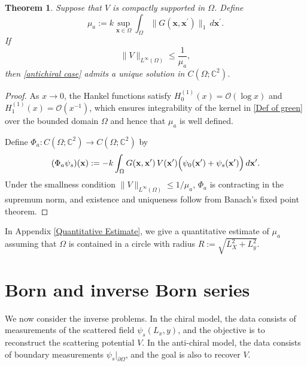 \documentclass[12pt,reqno]{amsart}
\newtheorem{thm}{Theorem}[section]
\begin{document}
\begin{thm}
Suppose that $V$ is compactly supported in $\Omega$. Define
\begin{equation}\label{def of mua}
\mu_a := k\sup _{\mathbf{x} \in \Omega} \int_{\Omega}\|G(\mathbf{x},\mathbf{x}^{\prime})\|_1 \,d\mathbf{x}^{\prime}.
\end{equation}
If
\[
\|V\|_{L^{\infty}(\Omega)}\leq \frac{1}{\mu_a},
\]
then \eqref{antichiral case} admits a unique solution in $C(\Omega; \mathbb{C}^2)$.
\end{thm}

\begin{proof}
As $x\to0$, the Hankel functions satisfy $H^{(1)}_0(x)=\mathcal{O}(\log x)$ and $H^{(1)}_1(x)=\mathcal{O}(x^{-1})$, which ensures integrability of the kernel in \eqref{Def of green} over the bounded domain $\Omega$ and hence that $\mu_a$ is well defined.

Define $\Phi_a:C(\Omega;\mathbb{C}^2)\to C(\Omega;\mathbb{C}^2)$ by
\[
(\Phi_a \psi_s)(\mathbf{x})
:=
-k\int_{\Omega}G(\mathbf{x},\mathbf{x}^{\prime})\,V(\mathbf{x}^{\prime})
\Bigl(\psi_0(\mathbf{x}^{\prime})+\psi_s(\mathbf{x}^{\prime})\Bigr)\,d\mathbf{x}^{\prime}.
\]
Under the smallness condition $\|V\|_{L^\infty(\Omega)}\le 1/\mu_a$, $\Phi_a$ is contracting in the supremum norm, and existence and uniqueness follow from Banach's fixed point theorem.
\end{proof}
In Appendix \ref{Quantitative Estimate}, we give a quantitative estimate of $\mu_a$ assuming that $\Omega$ is contained in a circle with radius $R:=\sqrt{L_X^2+L_y^2}$.

\section{Born and inverse Born series}
We now consider the inverse problems. In the chiral model, the data consists of measurements of the scattered field $\psi_s(L_x,y)$, and the objective is to reconstruct the scattering potential $V$. In the anti-chiral model, the data consists of boundary measurements $\psi_s|_{\partial\Omega}$, and the goal is also to recover $V$.
\end{document}
